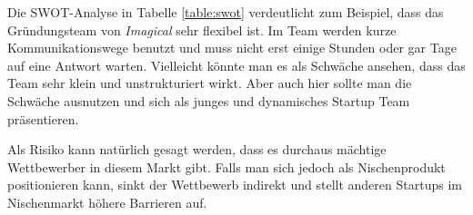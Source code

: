 Die SWOT-Analyse in Tabelle \ref{table:swot} verdeutlicht zum Beispiel, dass das Gründungsteam von \textit{Imagical} sehr flexibel ist. Im Team werden kurze Kommunikationswege benutzt und muss nicht erst einige Stunden oder gar Tage auf eine Antwort warten. Vielleicht könnte  man es als Schwäche ansehen, dass das Team sehr klein und unstrukturiert wirkt. Aber auch hier sollte man die Schwäche ausnutzen und sich als junges und dynamisches Startup Team präsentieren.

Als Risiko kann natürlich gesagt werden, dass es durchaus mächtige Wettbewerber in diesem Markt gibt. Falls man sich jedoch als Nischenprodukt positionieren kann, sinkt der Wettbewerb indirekt und stellt anderen Startups im Nischenmarkt höhere Barrieren auf.